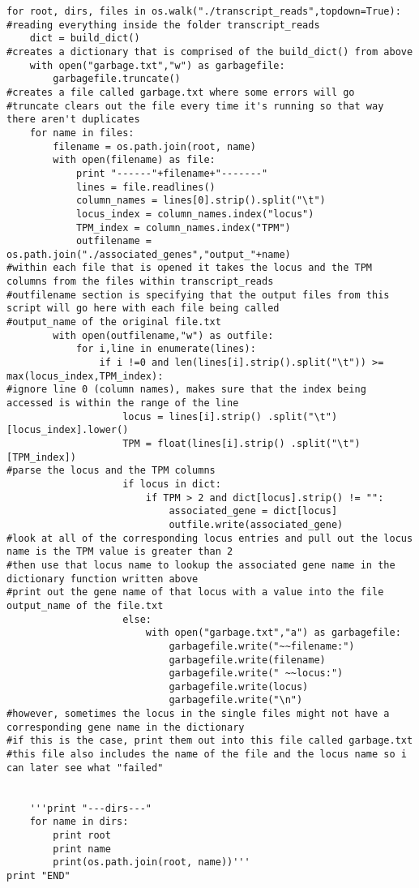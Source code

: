 \documentclass[12pt]{article}
\begin{document}
\begin{mdframed}[backgroundcolor=light-gray, roundcorner=10pt,leftmargin=1, rightmargin=1, innerleftmargin=15, innertopmargin=15,innerbottommargin=15, outerlinewidth=1, linecolor=light-gray]
\begin{lstlisting}
for root, dirs, files in os.walk("./transcript_reads",topdown=True):
#reading everything inside the folder transcript_reads
    dict = build_dict()
#creates a dictionary that is comprised of the build_dict() from above 
    with open("garbage.txt","w") as garbagefile:
        garbagefile.truncate()
#creates a file called garbage.txt where some errors will go
#truncate clears out the file every time it's running so that way there aren't duplicates 
    for name in files:
        filename = os.path.join(root, name)
        with open(filename) as file:
        	print "------"+filename+"-------"
        	lines = file.readlines()
        	column_names = lines[0].strip().split("\t")
        	locus_index = column_names.index("locus")
        	TPM_index = column_names.index("TPM")
        	outfilename = os.path.join("./associated_genes","output_"+name)
#within each file that is opened it takes the locus and the TPM columns from the files within transcript_reads
#outfilename section is specifying that the output files from this script will go here with each file being called
#output_name of the original file.txt
        with open(outfilename,"w") as outfile:
            for i,line in enumerate(lines):
        	    if i !=0 and len(lines[i].strip().split("\t")) >= max(locus_index,TPM_index):
#ignore line 0 (column names), makes sure that the index being accessed is within the range of the line
        		    locus = lines[i].strip() .split("\t")[locus_index].lower()
        		    TPM = float(lines[i].strip() .split("\t")[TPM_index])
#parse the locus and the TPM columns
        		    if locus in dict:  
        		        if TPM > 2 and dict[locus].strip() != "":
        		            associated_gene = dict[locus]
        		            outfile.write(associated_gene)
#look at all of the corresponding locus entries and pull out the locus name is the TPM value is greater than 2
#then use that locus name to lookup the associated gene name in the dictionary function written above
#print out the gene name of that locus with a value into the file output_name of the file.txt
        		    else:
        		        with open("garbage.txt","a") as garbagefile:
        		            garbagefile.write("~~filename:")
        		            garbagefile.write(filename)
        		            garbagefile.write(" ~~locus:")
        		            garbagefile.write(locus) 
        		            garbagefile.write("\n")
#however, sometimes the locus in the single files might not have a corresponding gene name in the dictionary
#if this is the case, print them out into this file called garbage.txt
#this file also includes the name of the file and the locus name so i can later see what "failed"         		        
        		        
        
    '''print "---dirs---"
    for name in dirs:
    	print root 
    	print name
        print(os.path.join(root, name))'''
print "END"   
	\end{lstlisting}
	\end{mdframed}
	
\end{document}

